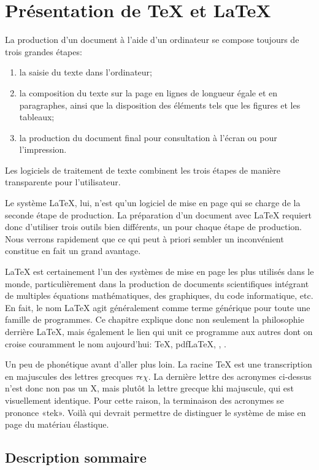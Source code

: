 \chapter{Présentation de {\TeX} et {\LaTeX}}
\label{chap:presentation}

La production d'un document à l'aide d'un ordinateur se compose
toujours de trois grandes étapes:
\begin{enumerate}
\item la saisie du texte dans l'ordinateur;
\item la composition du texte sur la page en lignes de longueur égale
  et en paragraphes, ainsi que la disposition des éléments tels que les
  figures et les tableaux;
\item la production du document final pour consultation à l'écran ou
  pour l'impression.
\end{enumerate}
Les logiciels de traitement de texte combinent les trois étapes de
manière transparente pour l'utilisateur.

Le système {\LaTeX}, lui, n'est qu'un logiciel de mise en page qui se
charge de la seconde étape de production. La préparation d'un document
avec {\LaTeX} requiert donc d'utiliser trois outils bien différents,
un pour chaque étape de production. Nous verrons rapidement que ce qui
peut à priori sembler un inconvénient constitue en fait un grand
avantage.

{\LaTeX} est certainement l'un des systèmes de mise en page les plus
utilisés dans le monde, particulièrement dans la production de
documents scientifiques intégrant de multiples équations
mathématiques, des graphiques, du code informatique, etc. En fait, le
nom {\LaTeX} agit généralement comme terme générique pour toute une
famille de programmes. Ce chapitre explique donc non seulement la
philosophie derrière {\LaTeX}, mais également le lien qui unit ce
programme aux autres dont on croise couramment le nom aujourd'hui:
{\TeX}, pdf{\LaTeX}, {\XeLaTeX}, {\LuaLaTeX}.

Un peu de phonétique avant d'aller plus loin. La racine {\TeX} est une
transcription en majuscules des lettres grecques $\tau\epsilon\chi$.
La dernière lettre des acronymes ci-dessus n'est donc non pas un X,
mais plutôt la lettre grecque khi majuscule, qui est visuellement
identique. Pour cette raison, la terminaison des acronymes se prononce
«tek». Voilà qui devrait permettre de distinguer le système de mise en
page du matériau élastique.


\section{Description sommaire}
\label{sec:presentation:description}

